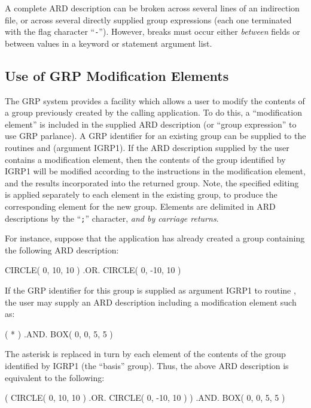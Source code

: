 \documentclass[11pt,nolof]{starlink}
\begin{document}
A complete ARD description can be broken across several lines of an indirection
file, or across several directly supplied group expressions (each one terminated
with the flag character ``\verb+-+''). However, breaks must occur either
\emph{between} fields or between values in a keyword or statement argument list.

\subsection{\label{SEC:MOD}Use of GRP Modification Elements}
The GRP system provides a facility which allows a user to modify the
contents of a group previously created by the calling application. To do
this, a ``modification element'' is included in the supplied ARD
description (or ``group expression'' to use GRP parlance). A GRP
identifier for an existing group can be supplied to the routines
 and 
(argument IGRP1). If the ARD description supplied by the user contains a
modification element, then the contents of the group identified by IGRP1
will be modified according to the instructions in the modification
element, and the results incorporated into the returned group. Note, the
specified editing is applied separately to each element in the existing
group, to produce the corresponding element for the new group. Elements are
delimited in ARD descriptions by the ``\verb+;+'' character, \emph{and by
carriage returns}.

For instance, suppose that the application has already created a group
containing the following ARD description:

\small
\begin{terminalv}
      CIRCLE( 0, 10, 10 ) .OR. CIRCLE( 0, -10, 10 )
\end{terminalv}
\normalsize

If the GRP identifier for this group is supplied as argument IGRP1 to
routine , the user may supply an ARD
description including a modification element such as:

\small
\begin{terminalv}
      ( * ) .AND. BOX( 0, 0, 5, 5 )
\end{terminalv}
\normalsize

The asterisk is replaced in turn by each element of the contents of the
group identified by IGRP1 (the ``basis'' group).
Thus, the above ARD description is equivalent to the following:

\small
\begin{terminalv}
      ( CIRCLE( 0, 10, 10 ) .OR. CIRCLE( 0, -10, 10 ) ) .AND. BOX( 0, 0, 5, 5 )
\end{terminalv}
\normalsize
\end{document}
